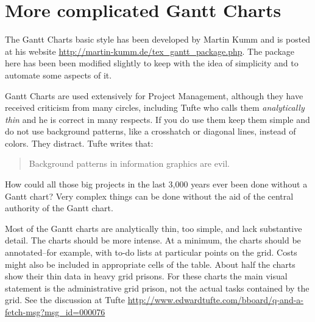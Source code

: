 \chapter{More complicated Gantt Charts}
\label{ganttcharts}
The Gantt Charts basic style has been developed by 
Martin Kumm and is posted at his website \url{http://martin-kumm.de/tex_gantt_package.php}. The package here has been been modified slightly to keep with the idea of simplicity and to automate some aspects of it. 


Gantt Charts are used extensively for Project Management, although they have received criticism from many circles, including Tufte who calls them \textit{analytically thin} and he is correct in many respects. If you do use them keep them simple and do not use background patterns, like a crosshatch or diagonal lines, instead of colors. They distract. Tufte writes that: 

\begin{quotation} 
   Background patterns in information graphics are evil.
\end{quotation} 

How could all those big projects in the last 3,000 years ever been done without a Gantt chart? Very complex things can be done without the aid of the central authority of the Gantt chart.

Most of the Gantt charts are analytically thin, too simple, and lack substantive detail. The charts should be more intense. At a minimum, the charts should be annotated--for example, with to-do lists at particular points on the grid. Costs might also be included in appropriate cells of the table. About half the charts show their thin data in heavy grid prisons. For these charts the main visual statement is the administrative grid prison, not the actual tasks contained by the grid. See the discussion at Tufte \url{http://www.edwardtufte.com/bboard/q-and-a-fetch-msg?msg_id=000076} 


